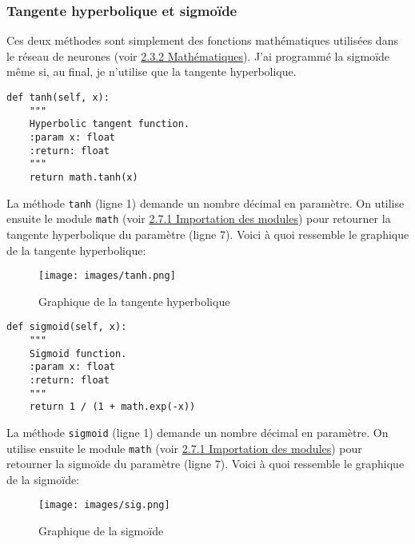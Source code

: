 \documentclass[12pt, a4paper, openany]{book}
\begin{document}
\subsubsection{Tangente hyperbolique et sigmoïde}
\label{r:2.7.5-tan}
Ces deux méthodes sont simplement des fonctions mathématiques utilisées dans le réseau de neurones (voir \hyperref[r:2.3.2]{2.3.2 Mathématiques}). J'ai programmé la sigmoïde même si, au final, je n'utilise que la tangente hyperbolique.
\begin{verbatim}
def tanh(self, x):
    """
    Hyperbolic tangent function.
    :param x: float
    :return: float
    """
    return math.tanh(x)
\end{verbatim}
La méthode \verb'tanh' (ligne 1) demande un nombre décimal en paramètre. On utilise ensuite le module \verb'math' (voir \hyperref[r:2.7.1-imp]{2.7.1 Importation des modules}) pour retourner la tangente hyperbolique du paramètre (ligne 7).
Voici à quoi ressemble le graphique de la tangente hyperbolique:
\begin{figure}[H]
    \centering
    \texttt{[image: images/tanh.png]}
    \caption{Graphique de la tangente hyperbolique}
\end{figure}\newpage
\begin{verbatim}
def sigmoid(self, x):
    """
    Sigmoid function.
    :param x: float
    :return: float
    """
    return 1 / (1 + math.exp(-x))
\end{verbatim}
La méthode \verb'sigmoid' (ligne 1) demande un nombre décimal en paramètre. On utilise ensuite le module \verb'math' (voir \hyperref[r:2.7.1-imp]{2.7.1 Importation des modules}) pour retourner la sigmoïde du paramètre (ligne 7).
Voici à quoi ressemble le graphique de la sigmoïde:
\begin{figure}[H]
    \centering
    \texttt{[image: images/sig.png]}
    \caption{Graphique de la sigmoïde}
\end{figure}
\end{document}
